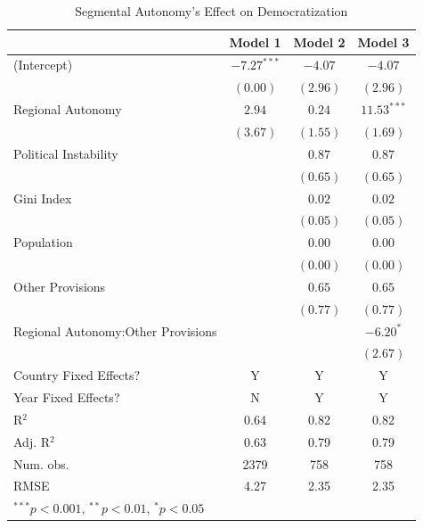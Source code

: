 \documentclass[12pt]{article}
\begin{document}
\begin{table}[!htbp]
	\begin{center}
		\begin{tabular}{l c c c }
			\hline
			& Model 1 & Model 2 & Model 3 \\
			\hline
			(Intercept)                  & $-7.27^{***}$ & $-4.07$  & $-4.07$       \\
			& $(0.00)$      & $(2.96)$ & $(2.96)$      \\
			Regional Autonomy                  & $2.94$        & $0.24$   & $11.53^{***}$ \\
			& $(3.67)$      & $(1.55)$ & $(1.69)$      \\
			Political Instability              &               & $0.87$   & $0.87$        \\
			&               & $(0.65)$ & $(0.65)$      \\
			Gini Index              &               & $0.02$   & $0.02$        \\
			&               & $(0.05)$ & $(0.05)$      \\
			Population                &               & $0.00$   & $0.00$        \\
			&               & $(0.00)$ & $(0.00)$      \\
			Other Provisions           &               & $0.65$   & $0.65$        \\
			&               & $(0.77)$ & $(0.77)$      \\
			Regional Autonomy:Other Provisions &               &          & $-6.20^{*}$   \\
			&               &          & $(2.67)$      \\
			\hline
			Country Fixed Effects?		 & Y			 & Y 		   & Y			  \\
			Year Fixed Effects?			 & N			 & Y		   & Y			  \\
			R$^2$                        & 0.64          & 0.82     & 0.82          \\
			Adj. R$^2$                   & 0.63          & 0.79     & 0.79          \\
			Num. obs.                    & 2379          & 758      & 758           \\
			RMSE                         & 4.27          & 2.35     & 2.35          \\
			\hline
			\multicolumn{4}{l}{\scriptsize{$^{***}p<0.001$, $^{**}p<0.01$, $^*p<0.05$}}
		\end{tabular}
		\caption{Segmental Autonomy's Effect on Democratization}
		\label{table:coefficients}
	\end{center}
\end{table}
\end{document}
